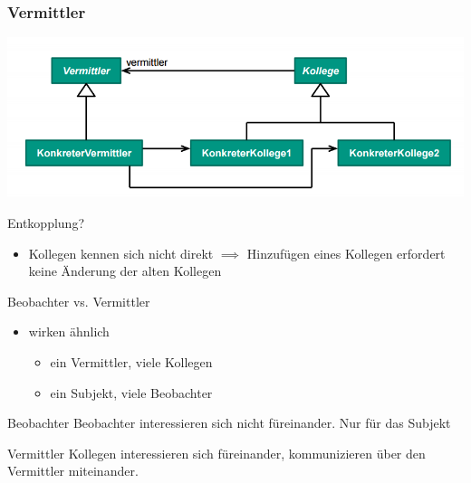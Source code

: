 \documentclass[18pt]{beamer}
\begin{document}
	\begin{frame}
		\frametitle{Vermittler}
		\centering
		\includegraphics[scale=0.45]{./pics/tut3/med.png}
		\begin{block}{Entkopplung?}
			\begin{itemize}
				\pause 
				\item Kollegen kennen sich nicht direkt  \linebreak \pause $\implies$ Hinzufügen eines Kollegen erfordert keine Änderung der alten Kollegen
			\end{itemize}
		\end{block}
	\end{frame}

\begin{frame}{Beobachter vs. Vermittler}
\begin{itemize}
	\item wirken ähnlich
	\begin{itemize}
		\item ein Vermittler, viele Kollegen
		\item ein Subjekt, viele Beobachter
	\end{itemize}
\end{itemize}
\pause
	\begin{block}{Beobachter}
		Beobachter interessieren sich nicht füreinander. Nur für das Subjekt
	\end{block}
	\begin{block}{Vermittler}
		Kollegen interessieren sich füreinander, kommunizieren über den Vermittler miteinander.
	\end{block}
\end{frame}
\end{document}

